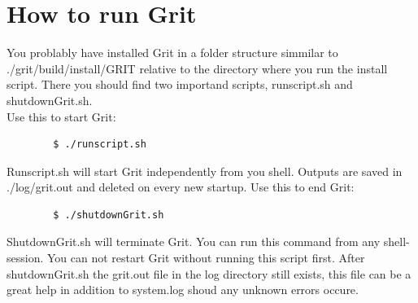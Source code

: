 \documentclass[10pt,a4paper, titlepage, toc=idx]{scrreprt}
\theoremstyle{definition}
\theoremstyle{plain}
\newcommand*{\product}{Grit}
\begin{document}
	\section{How to run \product{}}
	You problably have installed \product{} in a folder structure simmilar to 
	./grit/build/install/GRIT relative to the directory where you run the install script.
	There you should find two importand scripts, runscript.sh and
	shutdownGrit.sh.\\
	\noindent Use this to start \product{}:
	\begin{lstlisting}		
		$ ./runscript.sh
	\end{lstlisting}
	Runscript.sh will start \product{} independently from you shell. Outputs
	are saved in ./log/grit.out and deleted on every new startup.
	\noindent Use this to end \product{}:
	\begin{lstlisting}		
		$ ./shutdownGrit.sh
	\end{lstlisting}
	ShutdownGrit.sh will terminate \product{}. You can run this command from
	any shell-session. You can not restart \product{} without running this
	script first. After shutdownGrit.sh the grit.out file in the log
	directory still exists, this file can be a great help in addition to
	system.log shoud any unknown errors occure.
\end{document}
